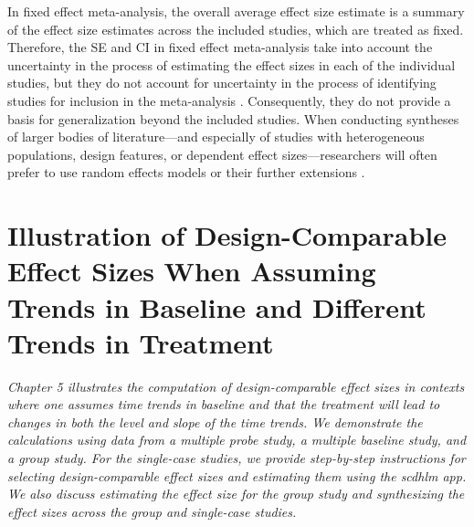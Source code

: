\documentclass[
]{book}
\begin{document}
In fixed effect meta-analysis, the overall average effect size estimate is a summary of the effect size estimates across the included studies, which are treated as fixed. Therefore, the SE and CI in fixed effect meta-analysis take into account the uncertainty in the process of estimating the effect sizes in each of the individual studies, but they do not account for uncertainty in the process of identifying studies for inclusion in the meta-analysis \citep{konstantopoulos2019statistically, Rice_Higgins_Lumley_2018}. Consequently, they do not provide a basis for generalization beyond the included studies. When conducting syntheses of larger bodies of literature---and especially of studies with heterogeneous populations, design features, or dependent effect sizes---researchers will often prefer to use random effects models \citep{Hedges_Vevea_1998} or their further extensions \citep{PustejovskyTipton2021, van2013three}.

\hypertarget{illustrate-D-CES-Btrends}{%
\chapter{Illustration of Design-Comparable Effect Sizes When Assuming Trends in Baseline and Different Trends in Treatment}\label{illustrate-D-CES-Btrends}}


\emph{Chapter 5 illustrates the computation of design-comparable effect sizes in contexts where one assumes time trends in baseline and that the treatment will lead to changes in both the level and slope of the time trends. We demonstrate the calculations using data from a multiple probe study, a multiple baseline study, and a group study. For the single-case studies, we provide step-by-step instructions for selecting design-comparable effect sizes and estimating them using the \emph{scdhlm} app. We also discuss estimating the effect size for the group study and synthesizing the effect sizes across the group and single-case studies.}
\end{document}
